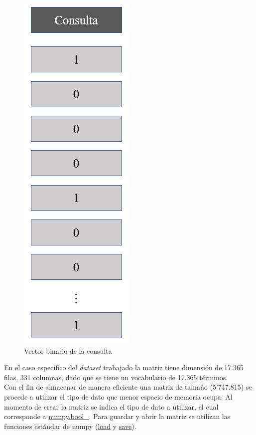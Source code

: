 \begin{figure}[]
    \centering
    \includegraphics[scale = 0.5]{doc/images/BS/b_query.PNG}
    \caption{Vector binario de la consulta}
    \label{fig:b_query}
\end{figure}

En el caso específico del \textit{dataset} trabajado la matriz tiene dimensión de 17.365 filas, 331 columnas, dado que se tiene un vocabulario de 17.365 términos.\\

Con el fin de almacenar de manera eficiente una matriz de tamaño (5'747.815) se procede a utilizar el tipo de dato que menor espacio de memoria ocupa. Al momento de crear la matriz se indica el tipo de dato a utilizar, el cual corresponde a \url{numpy.bool\_}. Para guardar y abrir la matriz se utilizan las funciones estándar de numpy (\url{load} y \url{save}).\\

